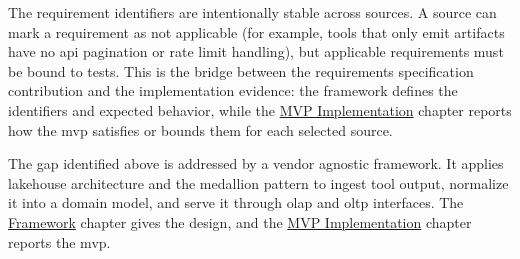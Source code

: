 The requirement identifiers are intentionally stable across sources. A source can mark a requirement as not applicable (for example, tools that only emit artifacts have no \gls{api} pagination or rate limit handling), but applicable requirements must be bound to tests. This is the bridge between the requirements specification contribution and the implementation evidence: the framework defines the identifiers and expected behavior, while the \hyperref[ch:implementation]{MVP Implementation} chapter reports how the \gls{mvp} satisfies or bounds them for each selected source.

The gap identified above is addressed by a vendor agnostic framework. It applies lakehouse architecture and the medallion pattern to ingest tool output, normalize it into a domain model, and serve it through \gls{olap} and \gls{oltp} interfaces. The \hyperref[ch:framework]{Framework} chapter gives the design, and the \hyperref[ch:implementation]{MVP Implementation} chapter reports the \gls{mvp}.

